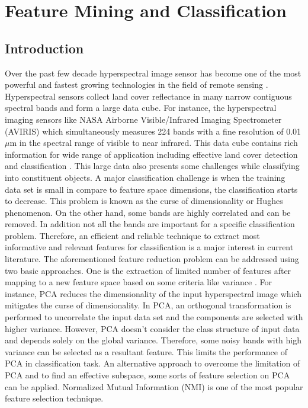 \documentclass[document.tex]{subfiles}
\begin{document}
\chapter{Feature Mining and Classification}
\section{Introduction}
\noindent Over the past few decade hyperspectral image sensor
has become one of the most powerful and fastest growing technologies in the field of remote sensing \cite{3}. Hyperspectral sensors collect land cover reflectance in many narrow contiguous spectral bands and form a large data cube\cite{3}. For instance, the hyperspectral imaging sensors like NASA Airborne Visible/Infrared Imaging
Spectrometer (AVIRIS) which simultaneously measures 224 bands with a fine resolution of 0.01 $\mu$m in the spectral range of visible to near infrared. This data cube contains rich information for wide range of application including effective land cover detection and classification \cite{24}. This large data also presents some challenges while classifying into constituent objects. A major classification challenge is when the training data set is small in compare to feature space dimensions, the classification starts to decrease. This problem is known as the curse of dimensionality or Hughes phenomenon\cite{4}\cite{25}\cite{26}. On the other hand, some bands are highly correlated and can be removed. In addition not all the bands are important for a specific classification problem. Therefore, an efficient and reliable technique to extract most informative and relevant features for classification is a major interest in current literature. The aforementioned feature reduction problem can be addressed using two basic approaches\cite{2}. One is the extraction of limited number of features after mapping to a new feature space based on some criteria like variance \cite{27,28}\cite{8}\cite{7}. For instance, PCA reduces the dimensionality of the input hyperspectral image which mitigates the curse of dimensionality. In PCA, an orthogonal transformation is performed to uncorrelate the input data set and the components are selected with higher variance. However, PCA doesn't consider the class structure of input data and depends solely on the global variance. Therefore, some noisy bands with high variance can be selected as a resultant feature. This limits the performance of PCA in classification task. An alternative approach to overcome the limitation of PCA and to find an effective subspace, some sorts of feature selection on PCA can be applied\cite{34}. Normalized Mutual Information (NMI) is one of the most popular feature selection technique\cite{9,10,20}.
\end{document}
